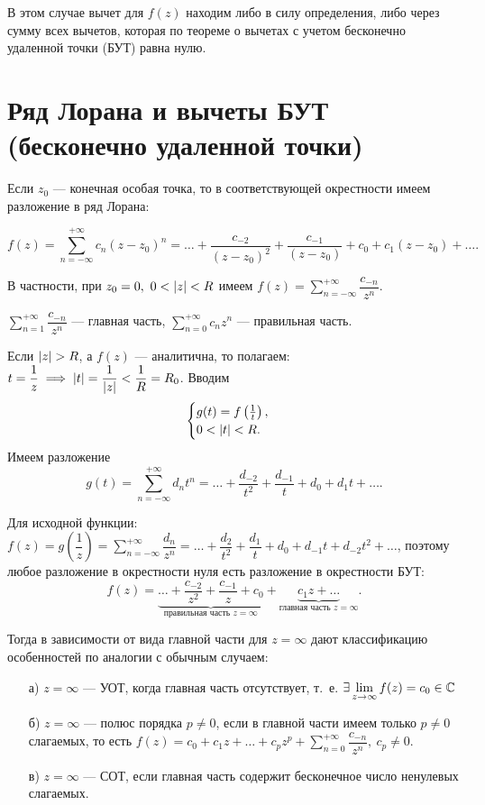 \documentclass[../../main.tex]{subfiles}
\begin{document}
	В этом случае вычет для $f(z) $ находим либо в силу определения, либо через 
	сумму всех вычетов, которая по теореме о вычетах с учетом бесконечно 
	удаленной точки (БУТ) равна нулю.
	
\section{Ряд Лорана и вычеты БУТ (бесконечно удаленной точки)}

	Если $z_0$ --- конечная особая точка, то в соответствующей окрестности имеем 
	разложение в ряд Лорана:
	
	\[
	f(z) = \sum_{n=-\infty}^{+\infty}c_n(z-z_0)^n=\dots+
	\frac{c_{-2}}{(z-z_0)^2}+\frac{c_{-1}}{(z-z_0)}+c_0+c_1(z-z_0)+\dots .
	\] 
	
	В частности, при $z_0=0,\ 0< \left|{z}\right| < R$ имеем
	$f(z)=\sum\limits_{n=-\infty}^{+\infty} \dfrac{c_{-n}}{z^n}$.
	
	$\sum\limits_{n=1}^{+\infty} \dfrac{c_{-n}}{z^n}$ --- главная часть,
	$\sum\limits_{n=0}^{+\infty} c_{n}z^n$ --- правильная часть. 
	 
	 Если $\left|{z}\right| > R$, а $f(z)$ --- аналитична, то полагаем: 
	 $t=\dfrac{1}{z} \implies \left|{t}\right| = \dfrac{1}{\left|{z}\right|} <
	 \dfrac1R=R_0$. Вводим
	 \[\begin{cases}
	 g(t)=f\left(\tfrac 1t\right),\\
	 0<\left|{t}\right| < R. 
	 \end{cases}\]
	 Имеем разложение 
	 \[g(t) = \sum\limits_{n=-\infty}^{+\infty}d_nt^n=
	 \dots + \dfrac{d_{-2}}{t^2} + \dfrac{d_{-1}}{t}+d_0+d_1t+\dots.
	 \]
	 
	 Для исходной функции: 
	 $f(z)=g\left(\dfrac1z\right)=\sum\limits_{n=-\infty}^{+\infty}
	 \dfrac{d_n}{z^n}=\dots + \dfrac{d_{2}}{t^2} + \dfrac{d_{1}}{t}
	 +d_0+d_{-1}t+d_{-2}t^2+\dots$, поэтому любое разложение в
	  окрестности нуля есть разложение в окрестности БУТ:
	 \[
	 f(z)=\underbrace{\dots+\frac{c_{-2}}{z^2}+\dfrac{c_{-1}}{z}+c_0}_{
	 \text{правильная часть }z=\infty}+
	 \underbrace{c_1z+\dots}_{\text{главная часть }z=\infty} .
	 \] 
	 
	 Тогда в зависимости от вида главной части для $z=\infty$ дают классификацию 
	 особенностей по аналогии с обычным случаем:
	 \begin{itemize}
	 	\item[а)] $z=\infty$ --- УОТ, когда главная часть отсутствует, т.~е.
	 	$\exists\lim\limits_{z\rightarrow \infty} f(z)=c_0\in \mathbb{C}$
	 	\item[б)] $z=\infty$ --- полюс порядка $p\neq 0$, если в 
	 	главной части имеем только $p\neq 0$ слагаемых, то есть 
	 	$
	 	f(z)=c_0+c_1z+\dots+c_pz^p+\sum\limits_{n=0}^{+\infty}\dfrac{c_{-n}}
	 	{z^n}, \ c_p\neq 0
	 	$. 
	 \item[в)] $z=\infty$ --- СОТ, если главная часть содержит бесконечное число 
	 ненулевых слагаемых.
	 \end{itemize}
	 
\end{document}

